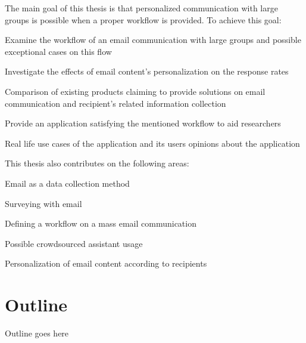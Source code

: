 The main goal of this thesis is that personalized communication with large groups is possible when a proper workflow is provided. To achieve this goal:

\begin{compactenum}
	\item Examine the workflow of an email communication with large groups and possible exceptional cases on this flow
	\item Investigate the effects of email content's personalization on the response rates
	\item Comparison of  existing products claiming to provide solutions on email communication and recipient's related information collection
	\item Provide an application satisfying the mentioned workflow to aid researchers
	\item Real life use cases of the application and its users opinions about the application
\end{compactenum}
\vspace{1cm}

This thesis also contributes on the following areas:

\begin{compactenum}
	\item Email as a data collection method
	\item Surveying with email
	\item Defining a workflow on a mass email communication
	\item Possible crowdsourced assistant usage
	\item Personalization of email content according to recipients
\end{compactenum}


\section{Outline}
\label{sec:3:Outline}
Outline goes here

